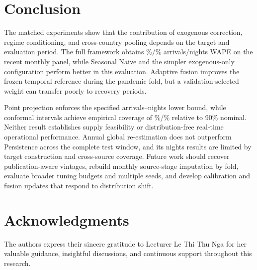 \documentclass[sigconf]{acmart}
\begin{document}
\section{Conclusion}
\label{sec:conclusion}
The matched experiments show that the contribution of exogenous correction, regime conditioning, and cross-country pooling depends on the target and evaluation period. The full framework obtains \ResultFullArrWAPE\%/\ResultFullNigWAPE\% arrivals/nights WAPE on the recent monthly panel, while Seasonal Naive and the simpler exogenous-only configuration perform better in this evaluation. Adaptive fusion improves the frozen temporal reference during the pandemic fold, but a validation-selected weight can transfer poorly to recovery periods.

Point projection enforces the specified arrivals--nights lower bound, while conformal intervals achieve empirical coverage of \ResultCoverageArr\%/\ResultCoverageNig\% relative to 90\% nominal. Neither result establishes supply feasibility or distribution-free real-time operational performance. Annual global re-estimation does not outperform Persistence across the complete test window, and its nights results are limited by target construction and cross-source coverage. Future work should recover publication-aware vintages, rebuild monthly source-stage imputation by fold, evaluate broader tuning budgets and multiple seeds, and develop calibration and fusion updates that respond to distribution shift.

\section*{Acknowledgments}
The authors express their sincere gratitude to Lecturer Le Thi Thu Nga for her valuable guidance, insightful discussions, and continuous support throughout this research.
\end{document}

